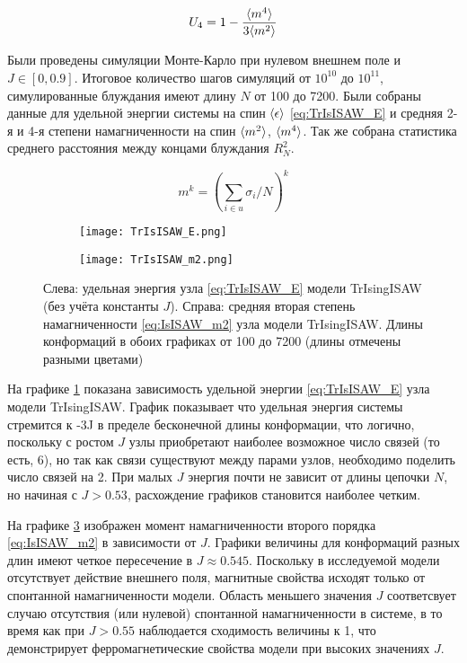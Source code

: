 \begin{equation}
\label{eq:IsISAW_U4}
	U_4 = 1 - \frac{\langle m^4 \rangle}{3 \langle m^2 \rangle}
\end{equation}


Были проведены симуляции Монте-Карло при нулевом внешнем поле и $J \in [0,0.9]$. 
Итоговое количество шагов симуляций от $10^10$ до $10^11$, симулированные блуждания имеют длину $N$ от 100 до 7200.
Были собраны данные для удельной энергии системы на спин $\langle \epsilon \rangle$ \eqref{eq:TrIsISAW_E} и средняя 2-я и 4-я степени намагниченности на спин $\langle m^2 \rangle$, $\langle m^4 \rangle$.
Так же собрана статистика среднего расстояния между концами блуждания $R^2_N$.

\begin{equation}
\label{eq:IsISAW_m2}
	m^{k} = (\sum_{i \in u} \sigma_i / N)^k
\end{equation}

\begin{figure}[h]
\begin{subfigure}{0.49\textwidth}
\texttt{[image: TrIsISAW\_E.png]}
\caption{}
\label{fig:TrIsISAW_E}
\end{subfigure}
\hfill
\begin{subfigure}{0.49\textwidth}
\texttt{[image: TrIsISAW\_m2.png]}
\caption{}
\label{fig:TrIsISAW_m2}
\end{subfigure}
\caption{Слева: удельная энергия узла \eqref{eq:TrIsISAW_E} модели TrIsingISAW (без учёта константы $J$).
Справа: средняя вторая степень намагниченности \eqref{eq:IsISAW_m2} узла модели TrIsingISAW. 
Длины конформаций в обоих графиках от 100 до 7200 (длины отмечены разными цветами)}

\end{figure}

На графике \ref{fig:TrIsISAW_E} показана зависимость удельной энергии \eqref{eq:TrIsISAW_E} узла модели TrIsingISAW.
График показывает что удельная энергия системы стремится к -3J в пределе бесконечной длины конформации, 
что логично, поскольку с ростом $J$ узлы приобретают наиболее возможное число связей (то есть, 6), но так как связи существуют между парами узлов,
необходимо поделить число связей на 2.
При малых $J$ энергия почти не зависит от длины цепочки $N$, но начиная с $J > 0.53$, расхождение графиков становится наиболее четким.

На графике \ref{fig:TrIsISAW_m2} изображен момент намагниченности второго порядка \eqref{eq:IsISAW_m2} в зависимости от $J$.
Графики величины для конформаций разных длин имеют четкое пересечение в $J \approx 0.545$.
Поскольку в исследуемой модели отсутствует действие внешнего поля, магнитные свойства исходят только от спонтанной намагниченности модели.
Область меньшего значения $J$ соответсвует случаю отсутствия (или нулевой) спонтанной намагниченности в системе,
в то время как при $J > 0.55$ наблюдается сходимость величины к 1, 
что демонстрирует ферромагнетические свойства модели при высоких значениях $J$.

